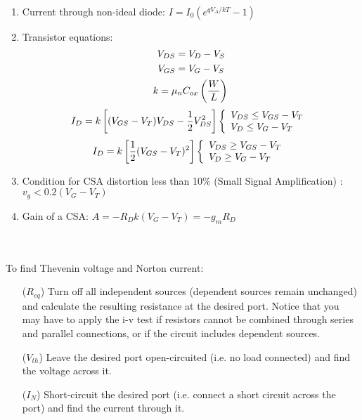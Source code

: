 \documentclass[twocolumn]{article}
\begin{document}
\begin{enumerate}
    \item Current through non-ideal diode: $I = I_0(e^{qV_A / kT} - 1)$
    \item Transistor equations: 
    \begin{equation*}
        V_{DS} = V_D -V_S\\
    \end{equation*}
    \begin{equation*}
        V_{GS} = V_G - V_S \\
    \end{equation*}
    \begin{equation*}
         k = \mu_n C_{ox} \left(\frac{W}{L}\right)\\
    \end{equation*}
    \begin{equation*}
        I_D = k\left[(V_{GS} - V_T)V_{DS} - \frac{1}{2} V_{DS}^2\right]
        \left\{
            \begin{array}{l}
                V_{DS} \leq V_{GS} - V_T \\
                V_D \leq V_G - V_T \\
            \end{array}
        \right.\\ 
    \end{equation*}
    \begin{equation*}
         I_D = k \left[\frac{1}{2} (V_{GS}-V_T)^2\right]
        \left\{
            \begin{array}{l}
                V_{DS} \geq V_{GS} - V_T \\
                V_D \geq V_G - V_T \\
            \end{array}
        \right.\\ 
    \end{equation*}  
    \item Condition for CSA distortion less than 10\% (Small Signal Amplification) : $v_{g\hat{}} < 0.2(V_G-V_T)$
    \item Gain of a CSA: $A = -R_Dk(V_G-V_T)=-g_m R_D$
\end{enumerate}
\hrulefill\\\\
To find Thevenin voltage and Norton current:
\begin{itemize}
    \item[($R_{eq}$)] Turn off all independent sources (dependent
    sources remain unchanged) and calculate the resulting resistance at the
    desired port. Notice that you may have to apply the i-v test if resistors
    cannot be combined through series and parallel connections, or if the
    circuit includes dependent sources.
    \item[($V_{th}$)] Leave the desired port open-circuited
    (i.e. no load connected) and find the voltage across it.
    \item[($I_N$)] Short-circuit the desired port (i.e. connect
    a short circuit across the port) and find the current through it. 
\end{itemize}
\end{document}
